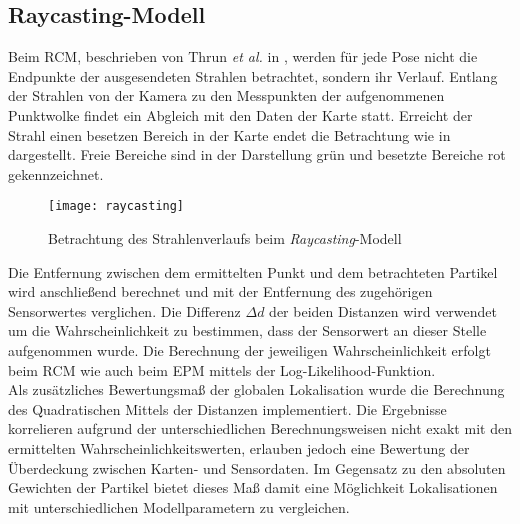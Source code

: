 \subsection{Raycasting-Modell}
Beim RCM, beschrieben von Thrun \textit{et al.} in \cite{Thrun2005}, werden für jede Pose nicht die Endpunkte der ausgesendeten Strahlen betrachtet, sondern ihr Verlauf. Entlang der Strahlen von der Kamera zu den Messpunkten der aufgenommenen Punktwolke findet ein Abgleich mit den Daten der Karte statt. Erreicht der Strahl einen besetzen Bereich in der Karte endet die Betrachtung wie in  dargestellt. Freie Bereiche sind in der Darstellung grün und besetzte Bereiche rot gekennzeichnet.

\begin{figure}[!ht]
	\begin{center}
		\texttt{[image: raycasting]}
		\caption{Betrachtung des Strahlenverlaufs beim \textit{Raycasting}-Modell}
		\label{fig.raycast}
	\end{center}
\end{figure}


Die Entfernung zwischen dem ermittelten Punkt und dem betrachteten Partikel wird anschließend berechnet und mit der Entfernung des zugehörigen Sensorwertes verglichen. Die Differenz $\Delta d$ der beiden Distanzen wird verwendet um die Wahrscheinlichkeit zu bestimmen, dass der Sensorwert an dieser Stelle aufgenommen wurde. Die Berechnung der jeweiligen Wahrscheinlichkeit erfolgt beim RCM wie auch beim EPM mittels der Log-Likelihood-Funktion.\\

Als zusätzliches Bewertungsmaß der globalen Lokalisation wurde die Berechnung des Quadratischen Mittels der Distanzen implementiert. Die Ergebnisse korrelieren aufgrund der unterschiedlichen Berechnungsweisen nicht exakt mit den ermittelten Wahrscheinlichkeitswerten, erlauben jedoch eine Bewertung der Überdeckung zwischen Karten- und Sensordaten. Im Gegensatz zu den absoluten Gewichten der Partikel bietet dieses Maß damit eine Möglichkeit Lokalisationen mit unterschiedlichen Modellparametern zu vergleichen.




